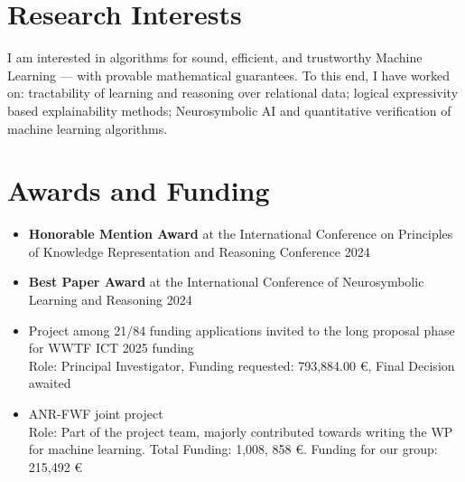 \documentclass[10pt, a4paper]{article}
\newcommand{\years}[1]{\marginnote{\scriptsize #1}}
\begin{document}
\section*{Research Interests}
I am interested in algorithms for sound, efficient, and trustworthy Machine Learning --- with provable mathematical guarantees. 
To this end, I have worked on: tractability of learning and reasoning over relational data; logical expressivity based explainability methods; Neurosymbolic AI and quantitative verification of machine learning algorithms. 

\section*{Awards and Funding}
\begin{itemize}
    \item \textbf{Honorable Mention Award} at the  International Conference on Principles of Knowledge Representation and Reasoning Conference 2024
    \item \textbf{Best Paper Award} at the International Conference of Neurosymbolic Learning and Reasoning 2024 
    \item Project  among 21/84 funding applications invited to the long proposal phase for WWTF ICT 2025 funding\\ 
    Role: Principal Investigator, Funding requested: 793,884.00 €, Final Decision awaited
    \item ANR-FWF joint project  \\Role: Part of the project team, majorly contributed towards writing the WP for machine learning. Total Funding: 1,008, 858 €. Funding for our group: 215,492 €
\end{itemize}





\end{document}
